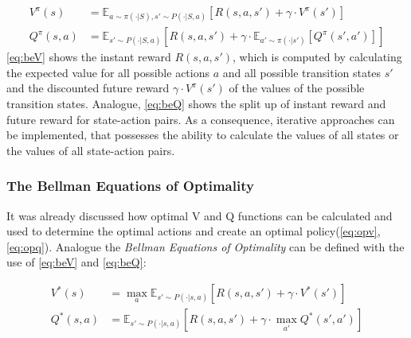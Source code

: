 \begin{align}
	V^{\pi} (s) &= \mathbb{E}_{a \sim \pi (\cdot | S), s' \sim P(\cdot | S,a)} [R(s,a,s') + \gamma \cdot V^{\pi}(s')] \label{eq:beV} \\
	Q^{\pi} (s,a) &= \mathbb{E}_{s' \sim P(\cdot |S,a)} [R(s,a,s') + \gamma \cdot  \mathbb{E}_{a' \sim \pi (\cdot | s')}[Q^{\pi}(s',a')]] \label{eq:beQ}
\end{align}
\newline
\cref{eq:beV} shows the instant reward $R(s,a,s')$,
which is computed by calculating the expected value for all possible actions $a$
and all possible transition states $s'$ and the discounted future reward $\gamma \cdot V^{\pi} (s')$ 
of the values of the possible transition states. 
Analogue, \cref{eq:beQ} shows the split up of instant reward and future reward 
for state-action pairs. As a consequence, iterative approaches can be implemented, 
that possesses the ability to calculate the values of all states or the values of 
all state-action pairs. 

\subsubsection{The Bellman Equations of Optimality}
It was already discussed how optimal V and Q functions can be calculated and used to determine the optimal actions 
and create an optimal policy(\cref{eq:opv}, \cref{eq:opq}). 
Analogue the \emph{Bellman Equations of Optimality} can be defined with the use of \cref{eq:beV} and \cref{eq:beQ}:

\begin{align}
	V^*(s)  &= \max_a \mathbb{E}_{s' \sim P(\cdot | s,a)} [R(s,a,s') + \gamma \cdot V^*(s')] \label{eq:bopV}\\
	Q^*(s,a) &= \mathbb{E}_{s' \sim P(\cdot | s,a)} [R(s,a,s') + \gamma \cdot \max_{a'} Q^*(s',a')] \label{eq:bopQ}
\end{align}



\newpage

